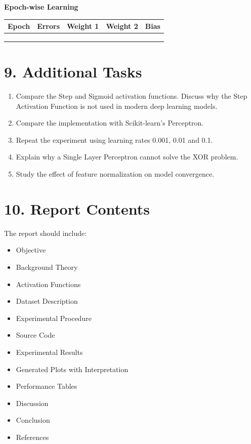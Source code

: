 \documentclass[11pt]{article}
\begin{document}
\vspace{3mm}

\textbf{Epoch-wise Learning}

\begin{tabular}{|c|c|c|c|c|}
\hline
Epoch & Errors & Weight 1 & Weight 2 & Bias\\
\hline
&&&&\\
&&&&\\
&&&&\\
\hline
\end{tabular}


\section*{9. Additional Tasks}

\begin{enumerate}[leftmargin=*]
\item Compare the Step and Sigmoid activation functions. Discuss why the Step Activation Function is not used in modern deep learning models.
\item Compare the implementation with Scikit-learn's Perceptron.
\item Repeat the experiment using learning rates 0.001, 0.01 and 0.1.
\item Explain why a Single Layer Perceptron cannot solve the XOR problem.
\item Study the effect of feature normalization on model convergence.
\end{enumerate}


\section*{10. Report Contents}

The report should include:

\begin{itemize}
\item Objective
\item Background Theory
\item Activation Functions
\item Dataset Description
\item Experimental Procedure
\item Source Code
\item Experimental Results
\item Generated Plots with Interpretation
\item Performance Tables
\item Discussion
\item Conclusion
\item References
\end{itemize}
\end{document}
